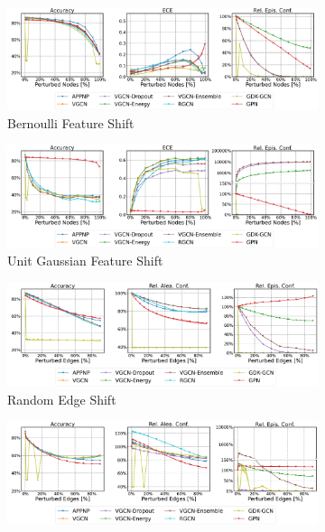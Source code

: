 \begin{figure}
    \centering
    \begin{subfigure}{\textwidth}
        \includegraphics[width=\textwidth]{resources/plots/PubMed-bernoulli-shift.pdf}
        \caption{Bernoulli Feature Shift}
    \end{subfigure}
    \begin{subfigure}{\textwidth}
        \includegraphics[width=\textwidth]{resources/plots/PubMed-normal-shift.pdf}
        \caption{Unit Gaussian Feature Shift}
    \end{subfigure}
    \begin{subfigure}{\textwidth}
        \includegraphics[width=\textwidth]{resources/plots/PubMed-random-shift.pdf}
        \caption{Random Edge Shift}
    \end{subfigure}
    \begin{subfigure}{\textwidth}
        \includegraphics[width=\textwidth]{resources/plots/PubMed-dice-shift.pdf}

\end{subfigure}
\end{figure}
